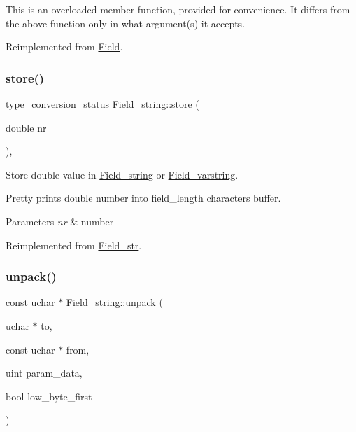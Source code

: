This is an overloaded member function, provided for convenience. It differs from the above function only in what argument(s) it accepts.

Reimplemented from \mbox{\hyperlink{classField_a9eaff8d3425ef0e1da69b32cbd8f2879}{Field}}.

\mbox{\label{classField__string_a154a1bcd6578f53da8bccb43cc57cb60}} 
\subsubsection{\texorpdfstring{store()}{store()}}
{\footnotesize\ttfamily type\+\_\+conversion\+\_\+status Field\+\_\+string\+::store (\begin{DoxyParamCaption}\item[{double}]{nr }\end{DoxyParamCaption})\hspace{0.3cm}{\ttfamily [inline]}, {\ttfamily [virtual]}}

Store double value in \mbox{\hyperlink{classField__string}{Field\+\_\+string}} or \mbox{\hyperlink{classField__varstring}{Field\+\_\+varstring}}.

Pretty prints double number into field\+\_\+length characters buffer.


\begin{DoxyParams}{Parameters}
{\em nr} & number \\
\hline
\end{DoxyParams}


Reimplemented from \mbox{\hyperlink{classField__str_ad4b48698ff57cae15a2df92f1145b102}{Field\+\_\+str}}.

\mbox{\label{classField__string_a2b13c788916d9efdb0683d9c92b0ccbf}} 
\subsubsection{\texorpdfstring{unpack()}{unpack()}}
{\footnotesize\ttfamily const uchar $\ast$ Field\+\_\+string\+::unpack (\begin{DoxyParamCaption}\item[{uchar $\ast$}]{to,  }\item[{const uchar $\ast$}]{from,  }\item[{uint}]{param\+\_\+data,  }\item[{bool}]{low\+\_\+byte\+\_\+first }\end{DoxyParamCaption})\hspace{0.3cm}{\ttfamily [virtual]}}

